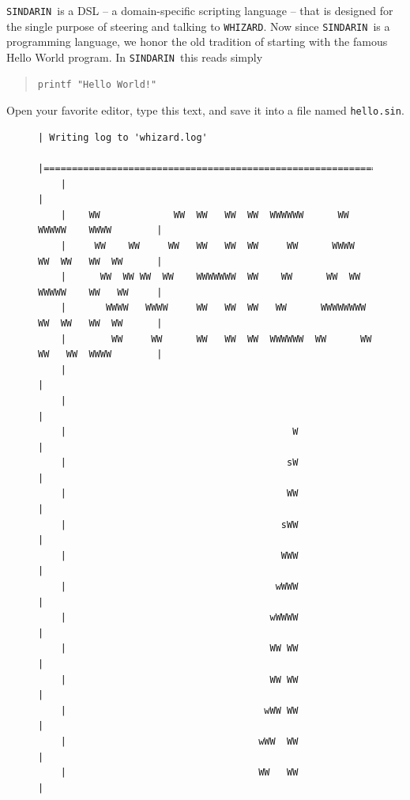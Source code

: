 \documentclass[12pt]{book}
\newcommand{\ttt}[1]{\texttt{#1}}
\newcommand{\whizard}{\ttt{WHIZARD}}
\newcommand{\sindarin}{\ttt{SINDARIN}}
\begin{document}
\sindarin\ is a DSL -- a domain-specific scripting language -- that is
designed for the single purpose of steering and talking to \whizard.
Now since \sindarin\ is a programming language, we honor the old
tradition of starting with the famous Hello World program.  In
\sindarin\ this reads simply
\begin{quote}
\begin{verbatim}
printf "Hello World!"
\end{verbatim}
\end{quote}
Open your favorite editor, type this text, and save it into a file
named \verb|hello.sin|.

\begin{figure}
  \centering
\begin{scriptsize}
\begin{Verbatim}[frame=single]
    | Writing log to 'whizard.log'
    |=============================================================================|
    |                                                                             |
    |    WW             WW  WW   WW  WW  WWWWWW      WW      WWWWW    WWWW        |
    |     WW    WW     WW   WW   WW  WW     WW      WWWW     WW  WW   WW  WW      |
    |      WW  WW WW  WW    WWWWWWW  WW    WW      WW  WW    WWWWW    WW   WW     |
    |       WWWW   WWWW     WW   WW  WW   WW      WWWWWWWW   WW  WW   WW  WW      |
    |        WW     WW      WW   WW  WW  WWWWWW  WW      WW  WW   WW  WWWW        |
    |                                                                             |
    |                                                                             |
    |                                        W                                    |
    |                                       sW                                    |
    |                                       WW                                    |
    |                                      sWW                                    |
    |                                      WWW                                    |
    |                                     wWWW                                    |
    |                                    wWWWW                                    |
    |                                    WW WW                                    |
    |                                    WW WW                                    |
    |                                   wWW WW                                    |
    |                                  wWW  WW                                    |
    |                                  WW   WW                                    |

\end{Verbatim}
\end{scriptsize}
\end{figure}
\end{document}
